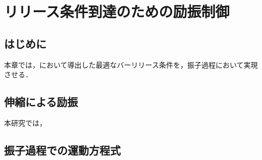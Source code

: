 \chapter[リリース条件到達のための励振制御]%
{リリース条件到達のための励振制御}
        \section{はじめに}
        
          本章では，において導出した最適なバーリリース条件を，振子過程において実現させる．
          
        \section{伸縮による励振}
          本研究では，
        \section{振子過程での運動方程式}
